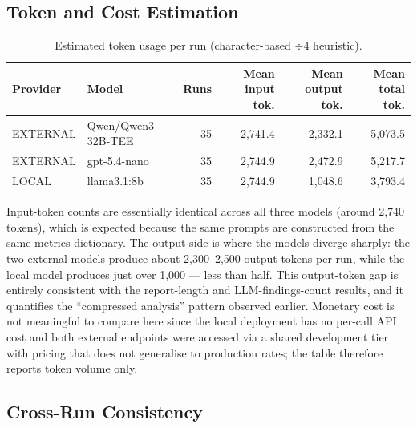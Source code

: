 \documentclass[]{UCD_CS_FYP_Report}
\begin{document}
\subsection{Token and Cost Estimation}
 
\begin{table}[!ht]
    \centering
    {\footnotesize
        \begin{tabular}{|l|l|r|r|r|r|}
        \hline
            \textbf{Provider} & \textbf{Model} & \textbf{Runs} & \textbf{Mean input tok.} & \textbf{Mean output tok.} & \textbf{Mean total tok.} \\ \hline
            EXTERNAL & Qwen/Qwen3-32B-TEE & 35 & 2{,}741.4 & 2{,}332.1 & 5{,}073.5 \\ \hline
            EXTERNAL & gpt-5.4-nano       & 35 & 2{,}744.9 & 2{,}472.9 & 5{,}217.7 \\ \hline
            LOCAL    & llama3.1:8b        & 35 & 2{,}744.9 & 1{,}048.6 & 3{,}793.4 \\ \hline
        \end{tabular}
    }
    \caption{Estimated token usage per run (character-based $\div 4$ heuristic).}
    \label{tab:token_estimation}
\end{table}
 
Input-token counts are essentially identical across all three models (around 2{,}740 tokens), which is expected because the same prompts are constructed from the same metrics dictionary. The output side is where the models diverge sharply: the two external models produce about 2{,}300--2{,}500 output tokens per run, while the local model produces just over 1{,}000 --- less than half. This output-token gap is entirely consistent with the report-length and LLM-findings-count results, and it quantifies the ``compressed analysis'' pattern observed earlier. Monetary cost is not meaningful to compare here since the local deployment has no per-call API cost and both external endpoints were accessed via a shared development tier with pricing that does not generalise to production rates; the table therefore reports token volume only.
 
\subsection{Cross-Run Consistency}
 
\end{document}

